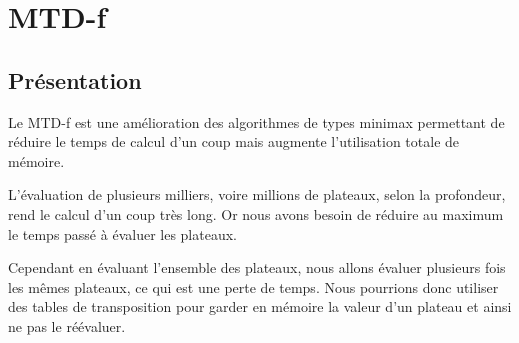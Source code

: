 \section{MTD-f}

    \subsection{Présentation}
        
        Le MTD-f est une amélioration des algorithmes de types minimax 
        permettant de réduire le temps de calcul d'un coup mais augmente
        l'utilisation totale de mémoire.

		\vspace{1em}
		
        L'évaluation de plusieurs milliers, voire millions de plateaux,
        selon la profondeur, rend le calcul d'un coup très long. Or nous
        avons besoin de réduire au maximum le temps passé à évaluer les
        plateaux.
        
        \vspace{1em}
        
        Cependant en évaluant l'ensemble des plateaux, nous allons évaluer plusieurs
        fois les mêmes plateaux, ce qui est une perte de temps. 
        Nous pourrions donc utiliser des tables de transposition pour garder
        en mémoire la valeur d'un plateau et ainsi ne pas le réévaluer.
        

